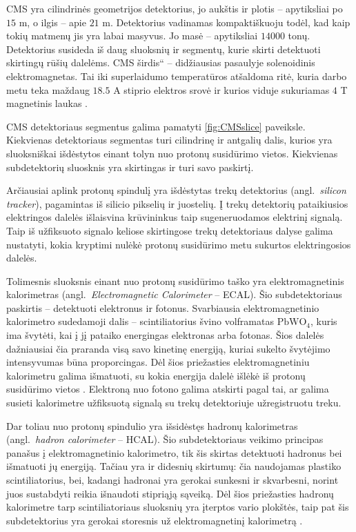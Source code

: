 \documentclass[a4paper, 12pt]{article}
\newcommand{\ltq}[1]{{\quotedblbase{}#1\textquotedblleft{}}}
\newlength\q
\begin{document}
CMS yra cilindrinės geometrijos detektorius, jo aukštis ir plotis -- apytiksliai po $15$ m, o ilgis --
apie $21$ m. Detektorius vadinamas kompaktiškuoju todėl, kad kaip tokių matmenų jis yra labai masyvus.
Jo masė -- apytiksliai $14000$ tonų.
Detektorius susideda iš daug sluoksnių ir segmentų, kurie skirti detektuoti skirtingų rūšių dalelėms.
CMS \ltq{širdis} -- didžiausias pasaulyje solenoidinis elektromagnetas.
Tai iki superlaidumo temperatūros atšaldoma ritė, kuria darbo metu teka maždaug $18.5$ A stiprio
elektros srovė ir kurios viduje sukuriamas $4$ T magnetinis laukas \cite{CMSdetector}.

CMS detektoriaus segmentus galima pamatyti \ref{fig:CMSslice} paveiksle.
Kiekvienas detektoriaus segmentas turi cilindrinę ir antgalių dalis, kurios yra sluoksniškai išdėstytos
einant tolyn nuo protonų susidūrimo vietos.
Kiekvienas subdetektorių sluosknis yra skirtingas ir turi savo paskirtį.

Arčiausiai aplink protonų spindulį yra išdėstytas trekų detektorius (angl.\ \textit{silicon tracker}),
pagamintas iš silicio pikselių ir juostelių.
Į trekų detektorių pataikiusios elektringos dalelės išlaisvina krūvininkus taip sugeneruodamos elektrinį
signalą.
Taip iš užfiksuoto signalo keliose skirtingose trekų detektoriaus dalyse galima nustatyti, kokia kryptimi
nulėkė protonų susidūrimo metu sukurtos elektringosios dalelės.

Tolimesnis sluoksnis einant nuo protonų susidūrimo taško yra elektromagnetinis kalorimetras (angl.\
\textit{Electromagnetic Calorimeter} -- ECAL).
Šio subdetektoriaus paskirtis -- detektuoti elektronus ir fotonus.
Svarbiausia elektromagnetinio kalorimetro sudedamoji dalis -- scintiliatorius švino volframatas $\mathrm{PbWO}_{4}$,
kuris ima švytėti, kai į jį pataiko energingas elektronas arba fotonas.
Šios dalelės dažniausiai čia praranda visą savo kinetinę energiją, kuriai sukelto švytėjimo intensyvumas
būna proporcingas.
Dėl šios priežasties elektromagnetiniu kalorimetru galima išmatuoti, su kokia energija dalelė išlėkė iš
protonų susidūrimo vietos \cite{Ecal}.
Elektroną nuo fotono galima atskirti pagal tai, ar galima susieti kalorimetre užfiksuotą signalą su trekų
detektoriuje užregistruotu treku.

Dar toliau nuo protonų spindulio yra išsidėstęs hadronų kalorimetras (angl.\ \textit{hadron calorimeter} -- HCAL).
Šio subdetektoriaus veikimo principas panašus į elektromagnetinio kalorimetro, tik šis skirtas detektuoti
hadronus bei išmatuoti jų energiją.
Tačiau yra ir didesnių skirtumų: čia naudojamas plastiko scintiliatorius, bei, kadangi hadronai yra gerokai
sunkesni ir skvarbesni, norint juos sustabdyti reikia išnaudoti stipriąją sąveiką.
Dėl šios priežasties hadronų kalorimetre tarp scintiliatoriaus sluoksnių yra įterptos vario plokštės, taip
pat šis subdetektorius yra gerokai storesnis už elektromagnetinį kalorimetrą \cite{Hcal}.
\end{document}
